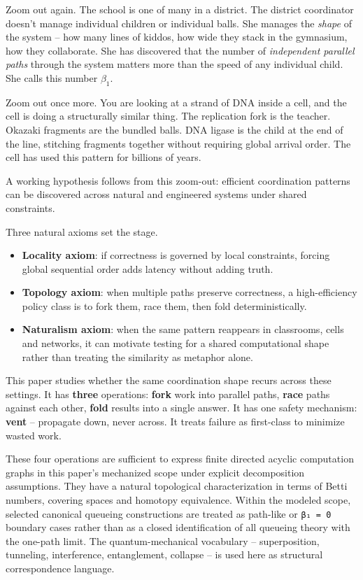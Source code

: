 \documentclass[
  11pt,
]{article}
\begin{document}
Zoom out again. The school is one of many in a district. The district
coordinator doesn't manage individual children or individual balls. She
manages the \emph{shape} of the system -- how many lines of kiddos, how
wide they stack in the gymnasium, how they collaborate. She has
discovered that the number of \emph{independent parallel paths} through
the system matters more than the speed of any individual child. She
calls this number \(\beta_1\).

Zoom out once more. You are looking at a strand of DNA inside a cell,
and the cell is doing a structurally similar thing. The replication fork
is the teacher. Okazaki fragments are the bundled balls. DNA ligase is
the child at the end of the line, stitching fragments together without
requiring global arrival order. The cell has used this pattern for
billions of years.

A working hypothesis follows from this zoom-out: efficient coordination
patterns can be discovered across natural and engineered systems under
shared constraints.

Three natural axioms set the stage.

\begin{itemize}
\item
  \textbf{Locality axiom}: if correctness is governed by local
  constraints, forcing global sequential order adds latency without
  adding truth.
\item
  \textbf{Topology axiom}: when multiple paths preserve correctness, a
  high-efficiency policy class is to fork them, race them, then fold
  deterministically.
\item
  \textbf{Naturalism axiom}: when the same pattern reappears in
  classrooms, cells and networks, it can motivate testing for a shared
  computational shape rather than treating the similarity as metaphor
  alone.
\end{itemize}

This paper studies whether the same coordination shape recurs across
these settings. It has \textbf{three} operations: \textbf{fork} work
into parallel paths, \textbf{race} paths against each other,
\textbf{fold} results into a single answer. It has one safety mechanism:
\textbf{vent} -- propagate down, never across. It treats failure as
first-class to minimize wasted work.

These four operations are sufficient to express finite directed acyclic
computation graphs in this paper's mechanized scope under explicit
decomposition assumptions. They have a natural topological
characterization in terms of Betti numbers, covering spaces and homotopy
equivalence. Within the modeled scope, selected canonical queueing
constructions are treated as path-like or \texttt{β₁\ =\ 0} boundary
cases rather than as a closed identification of all queueing theory with
the one-path limit. The quantum-mechanical vocabulary -- superposition,
tunneling, interference, entanglement, collapse -- is used here as
structural correspondence language.
\end{document}
